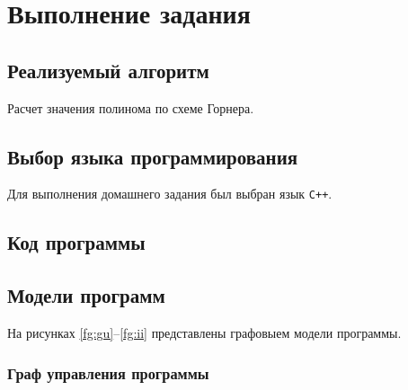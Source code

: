 \chapter{Выполнение задания}

\section{Реализуемый алгоритм}
Расчет значения полинома по схеме Горнера.

\section{Выбор языка программирования}
Для выполнения домашнего задания был выбран язык \texttt{C++}.

\section{Код программы}



\section{Модели программ}

На рисунках \ref{fg:gu}--\ref{fg:ii} представлены графовыем модели программы.

\clearpage

\subsection{Граф управления программы}

